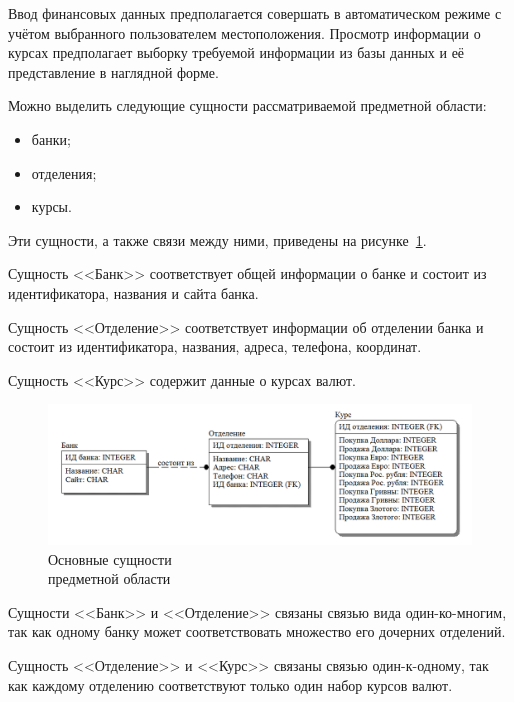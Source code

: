 Ввод финансовых данных предполагается совершать в автоматическом режиме
с учётом выбранного пользователем местоположения.
Просмотр информации о курсах предполагает выборку требуемой информации
из базы данных и её представление в наглядной форме. 

Можно выделить следующие сущности рассматриваемой
предметной области:
\begin{itemize}
  \item банки;
  \item отделения;
  \item курсы.
\end{itemize}

Эти сущности, а также связи между ними, приведены на рисунке~\ref{fig:entities}.

Сущность <<Банк>> соответствует общей информации о банке
и состоит из идентификатора, названия и сайта банка.

Сущность <<Отделение>> соответствует информации об отделении банка
и состоит из идентификатора, названия, адреса, телефона, координат.

Сущность <<Курс>> содержит данные о курсах валют.

\begin{figure}[h!]
  \centering
  \includegraphics[width=150mm]{pic/entities}
  \caption{Основные сущности \\ предметной области}
  \label{fig:entities}
\end{figure}

Сущности <<Банк>> и <<Отделение>> связаны связью
вида один-ко-многим, так как одному банку может соответствовать
множество его дочерних отделений.

Сущность <<Отделение>> и <<Курс>> связаны связью один-к-одному,
так как каждому отделению соответствуют только один набор курсов валют.
